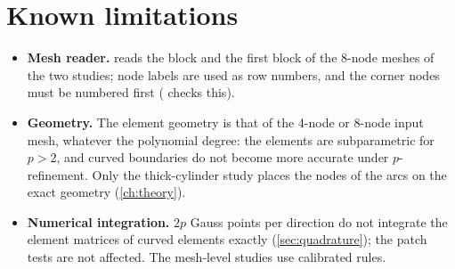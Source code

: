 \chapter{Known limitations}
\label{ch:issues}

\begin{itemize}
  \item \textbf{Mesh reader.}  reads the  block and
    the first  block of the 8-node meshes of the two studies; node
    labels are used as row numbers, and the corner nodes must be numbered first
    ( checks this).
  \item \textbf{Geometry.} The element geometry is that of the 4-node or 8-node
    input mesh, whatever the polynomial degree: the elements are subparametric for
    $p>2$, and curved boundaries do not become more accurate under
    $p$-refinement. Only the thick-cylinder study places the nodes of the arcs on the
    exact geometry (\cref{ch:theory}).
  \item \textbf{Numerical integration.} $2p$ Gauss points per direction do not
    integrate the element matrices of curved elements exactly
    (\cref{sec:quadrature}); the patch tests are not affected. The mesh-level studies
    use calibrated rules.
\end{itemize}

